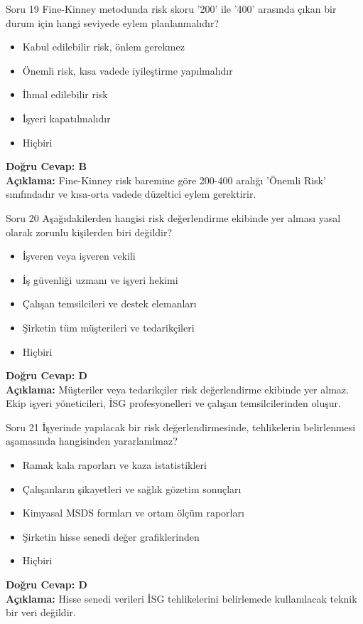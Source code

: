 \documentclass[12pt,a4paper]{article}
\begin{document}
\begin{testcard}{Soru 19}
    Fine-Kinney metodunda risk skoru '200' ile '400' arasında çıkan bir durum için hangi seviyede eylem planlanmalıdır?
    \begin{itemize}
        \item[A)] Kabul edilebilir risk, önlem gerekmez
        \item[B)] Önemli risk, kısa vadede iyileştirme yapılmalıdır
        \item[C)] İhmal edilebilir risk
        \item[D)] İşyeri kapatılmalıdır
        \item[E)] Hiçbiri
    \end{itemize}
    \tcblower
    \textbf{Doğru Cevap: B} \\
    \textbf{Açıklama:} Fine-Kinney risk baremine göre 200-400 aralığı 'Önemli Risk' sınıfındadır ve kısa-orta vadede düzeltici eylem gerektirir.
\end{testcard}

\begin{testcard}{Soru 20}
    Aşağıdakilerden hangisi risk değerlendirme ekibinde yer alması yasal olarak zorunlu kişilerden biri değildir?
    \begin{itemize}
        \item[A)] İşveren veya işveren vekili
        \item[B)] İş güvenliği uzmanı ve işyeri hekimi
        \item[C)] Çalışan temsilcileri ve destek elemanları
        \item[D)] Şirketin tüm müşterileri ve tedarikçileri
        \item[E)] Hiçbiri
    \end{itemize}
    \tcblower
    \textbf{Doğru Cevap: D} \\
    \textbf{Açıklama:} Müşteriler veya tedarikçiler risk değerlendirme ekibinde yer almaz. Ekip işyeri yöneticileri, İSG profesyonelleri ve çalışan temsilcilerinden oluşur.
\end{testcard}

\begin{testcard}{Soru 21}
    İşyerinde yapılacak bir risk değerlendirmesinde, tehlikelerin belirlenmesi aşamasında hangisinden yararlanılmaz?
    \begin{itemize}
        \item[A)] Ramak kala raporları ve kaza istatistikleri
        \item[B)] Çalışanların şikayetleri ve sağlık gözetim sonuçları
        \item[C)] Kimyasal MSDS formları ve ortam ölçüm raporları
        \item[D)] Şirketin hisse senedi değer grafiklerinden
        \item[E)] Hiçbiri
    \end{itemize}
    \tcblower
    \textbf{Doğru Cevap: D} \\
    \textbf{Açıklama:} Hisse senedi verileri İSG tehlikelerini belirlemede kullanılacak teknik bir veri değildir.
\end{testcard}
\end{document}
